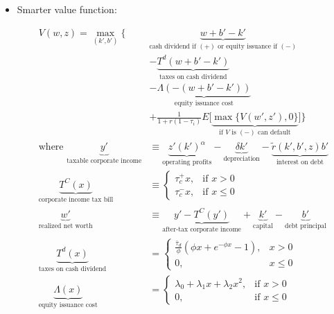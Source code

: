 \documentclass{article}
\begin{document}
\begin{itemize}
\pagebreak

\item Smarter value function:

\begin{align*}
V(w, z) =
\max_{(k', b')} \Bigg\{ 
& \underbrace{w + b' - k'}_{\text{cash dividend if } (+) \text{ or equity issuance if } (-)} \\ 
&- \underbrace{T^d(w + b' - k')}_{\text{taxes on cash dividend}} \\
&- \underbrace{\Lambda(-(w + b' - k'))}_{\text{equity issuance cost}} \\
&+ \frac{1}{1+r(1-\tau_i)} E\Big[\underbrace{\max\{ V(w', z'), 0\}}_{\text{if }V \text{ is } (-) \text{ can default}}\Big] \Bigg\} \\
\text{where }
\underbrace{y'}_{\text{taxable corporate income}} &\equiv \underbrace{z' (k')^\alpha}_{\text{operating profits}} - \underbrace{\delta k'}_{\text{depreciation}} - \underbrace{\tilde r(k', b', z) b'}_{\text{interest on debt}} \\
\underbrace{T^C(x)}_{\text{corporate income tax bill}} &\equiv 
\begin{cases} 
\tau_c^+ x, & \text{if }x > 0 \\
\tau_c^- x, & \text{if }x \le 0
\end{cases}\\
\underbrace{w'}_{\text{realized net worth}} &\equiv \underbrace{y' - T^C(y')}_{\text{after-tax corporate income}}+ \underbrace{k'}_{\text{capital}}  - \underbrace{b'}_{\text{debt principal}} \\
\underbrace{T^d(x)}_{\text{taxes on cash dividend}} &= 
\begin{cases}
\frac{\bar \tau_d}{\phi}(\phi x + e^{-\phi x} - 1), & x > 0 \\
0,& x \le 0
\end{cases} \\
\underbrace{\Lambda(x)}_{\text{equity issuance cost}} &= 
\begin{cases} 
\lambda_0 + \lambda_1 x + \lambda_2 x^2, & \text{if }x > 0 \\
0, & \text{if }x \le 0
\end{cases}
\end{align*}



\end{itemize}
\end{document}

